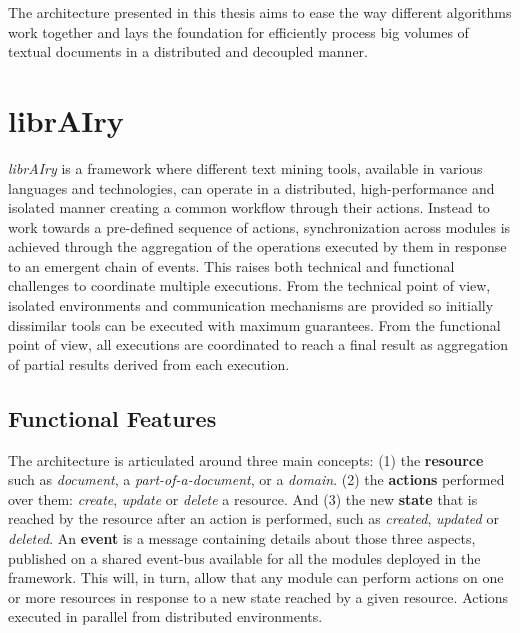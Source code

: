 
The architecture presented in this thesis aims to ease the way different algorithms work together and lays the foundation for efficiently process big volumes of textual documents in a distributed and decoupled manner.

\section{librAIry}\label{sec:librairy}

\textit{librAIry} is a framework where different text mining tools, available in various languages and technologies, can operate in a distributed, high-performance and isolated manner creating a common workflow through their actions. Instead to work towards a pre-defined sequence of actions, synchronization across modules is achieved through the aggregation of the operations executed by them in response to an emergent chain of events. This raises both technical and functional challenges to coordinate multiple executions. From the technical point of view, isolated environments and communication mechanisms are provided so initially dissimilar tools can be executed with maximum guarantees. From the functional point of view, all executions are coordinated to reach a final result as aggregation of partial results derived from each execution.

\subsection{Functional Features}
The architecture is articulated around three main concepts: (1) the \textbf{resource} such as \textit{document}, a \textit{part-of-a-document}, or a \textit{domain}. (2) the \textbf{actions} performed over them: \textit{create}, \textit{update} or \textit{delete} a resource. And (3) the new \textbf{state} that is reached by the resource after an action is performed, such as  \textit{created}, \textit{updated} or \textit{deleted}. An \textbf{event} is a message containing details about those three aspects, published on a shared event-bus available for all the modules deployed in the framework. This will, in turn, allow that any module can perform actions on one or more resources in response to a new state reached by a given resource. Actions executed in parallel from distributed environments.

